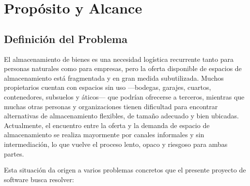 
\section{Propósito y Alcance}

\subsection{Definición del Problema}

El almacenamiento de bienes es una necesidad logística recurrente tanto para personas naturales como para empresas, pero la oferta disponible de espacios de almacenamiento está fragmentada y en gran medida subutilizada. Muchos propietarios cuentan con espacios sin uso ---bodegas, garajes, cuartos, contenedores, subsuelos y áticos--- que podrían ofrecerse a terceros, mientras que muchas otras personas y organizaciones tienen dificultad para encontrar alternativas de almacenamiento flexibles, de tamaño adecuado y bien ubicadas. Actualmente, el encuentro entre la oferta y la demanda de espacio de almacenamiento se realiza mayormente por canales informales y sin intermediación, lo que vuelve el proceso lento, opaco y riesgoso para ambas partes.

Esta situación da origen a varios problemas concretos que el presente proyecto de software busca resolver:

